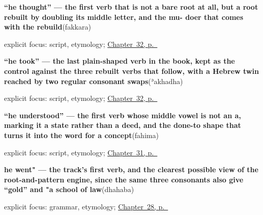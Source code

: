 \noindent\begin{minipage}[t]{\linewidth}
\raggedright
\textbf{\textquotedblleft{}he thought\textquotedblright{} — the first verb that is not a bare root at all, but a root rebuilt by doubling its middle letter, and the mu- doer that comes with the rebuild}\enspace\emph{}\enspace(fakkara)\par
\footnotesize explicit focus: script, etymology; \hyperref[ch:ar-taking-thinking-helping-loving]{Chapter~32, p.~\pageref*{ch:ar-taking-thinking-helping-loving}}
\end{minipage}\par\smallskip

\noindent\begin{minipage}[t]{\linewidth}
\raggedright
\textbf{\textquotedblleft{}he took\textquotedblright{} — the last plain-shaped verb in the book, kept as the control against the three rebuilt verbs that follow, with a Hebrew twin reached by two regular consonant swaps}\enspace\emph{}\enspace(ʾakhadha)\par
\footnotesize explicit focus: script, etymology; \hyperref[ch:ar-taking-thinking-helping-loving]{Chapter~32, p.~\pageref*{ch:ar-taking-thinking-helping-loving}}
\end{minipage}\par\smallskip

\noindent\begin{minipage}[t]{\linewidth}
\raggedright
\textbf{\textquotedblleft{}he understood\textquotedblright{} — the first verb whose middle vowel is not an a, marking it a state rather than a deed, and the done-to shape that turns it into the word for a concept}\enspace\emph{}\enspace(fahima)\par
\footnotesize explicit focus: script, etymology; \hyperref[ch:ar-understanding-reading-writing]{Chapter~31, p.~\pageref*{ch:ar-understanding-reading-writing}}
\end{minipage}\par\smallskip

\noindent\begin{minipage}[t]{\linewidth}
\raggedright
\textbf{he went" — the track's first verb, and the clearest possible view of the root-and-pattern engine, since the same three consonants also give \textquotedblleft{}gold\textquotedblright{} and "a school of law}\enspace\emph{}\enspace(dhahaba)\par
\footnotesize explicit focus: grammar, etymology; \hyperref[ch:ar-going-and-coming]{Chapter~28, p.~\pageref*{ch:ar-going-and-coming}}
\end{minipage}\par\smallskip

